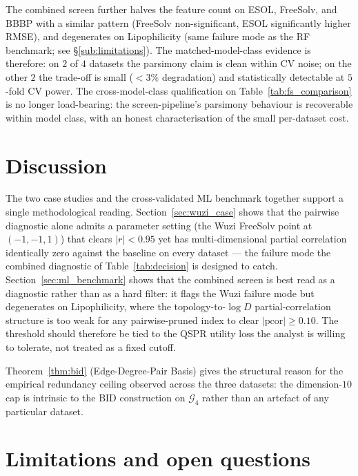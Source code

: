 \documentclass[STIX1COL]{WileyNJDv5}
\theoremstyle{definition}
\begin{document}
The combined screen further halves the feature count on ESOL,
FreeSolv, and BBBP with a similar pattern (FreeSolv non-significant,
ESOL significantly higher RMSE), and degenerates on Lipophilicity
(same failure mode as the RF benchmark; see \S\ref{sub:limitations}).
The matched-model-class evidence is therefore: on $2$ of $4$ datasets
the parsimony claim is clean within CV noise; on the other $2$ the
trade-off is small ($<3\%$ degradation) and statistically detectable
at $5$-fold CV power. The cross-model-class qualification on
Table~\ref{tab:fs_comparison} is no longer load-bearing: the
screen-pipeline's parsimony behaviour is recoverable within model
class, with an honest characterisation of the small per-dataset
cost.

\FloatBarrier

\section{Discussion}\label{sec:discussion}

The two case studies and the cross-validated ML benchmark together
support a single methodological reading. Section~\ref{sec:wuzi_case}
shows that the pairwise diagnostic alone admits a parameter setting
(the Wuzi FreeSolv point at $(-1, -1, 1)$) that clears
$|r| < 0.95$ yet has multi-dimensional partial correlation
identically zero against the baseline on every dataset --- the
failure mode the combined diagnostic of Table~\ref{tab:decision} is
designed to catch. Section~\ref{sec:ml_benchmark} shows that the
combined screen is best read as a diagnostic rather than as a hard
filter: it flags the Wuzi failure mode but degenerates on
Lipophilicity, where the topology-to-$\log D$ partial-correlation
structure is too weak for any pairwise-pruned index to clear
$|\mathrm{pcor}| \ge 0.10$. The threshold should therefore be tied
to the QSPR utility loss the analyst is willing to tolerate, not
treated as a fixed cutoff.

Theorem~\ref{thm:bid} (Edge-Degree-Pair Basis) gives the structural
reason for the empirical redundancy ceiling observed across the
three datasets: the dimension-$10$ cap is intrinsic to the BID
construction on $\mathcal{G}_4$ rather than an artefact of any
particular dataset.

\section{Limitations and open questions}\label{sec:limitations}
\end{document}
